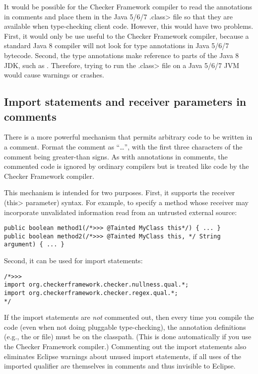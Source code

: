 It would be possible for the Checker Framework compiler to read the
annotations in comments and place them in the Java 5/6/7 \<.class> file so
that they are available when type-checking client code.  However, this
would have two problems.  First, it would only be use useful to the Checker
Framework compiler, because a standard Java 8 compiler will not look for
type annotations in Java 5/6/7 bytecode.  Second, the type annotations
make reference to parts of the Java 8 JDK, such as
.
Therefore, trying to run the \<.class> file on a Java 5/6/7 JVM
would cause warnings or crashes.


\subsection{Import statements and receiver parameters in comments\label{receivers-and-imports-in-comments}}

There is a more powerful mechanism that permits arbitrary code to be
written in a comment.  Format the comment as ``\code{/*>>>}\ldots\code{*/}'',
with the first three characters of the comment being greater-than signs. As
with annotations in comments, the commented code is ignored by ordinary
compilers but is treated like code by the
Checker Framework compiler.

This mechanism is intended for two purposes.
First, it supports the receiver (\<this> parameter) syntax.  For example,
to specify a method whose receiver may incorporate unvalidated information
read from an untrusted external source:

\begin{Verbatim}
public boolean method1(/*>>> @Tainted MyClass this*/) { ... }
public boolean method2(/*>>> @Tainted MyClass this, */ String argument) { ... }
\end{Verbatim}

Second, it can be used for import statements:

\begin{Verbatim}
/*>>>
import org.checkerframework.checker.nullness.qual.*;
import org.checkerframework.checker.regex.qual.*;
*/
\end{Verbatim}

\noindent
If the import statements are \emph{not} commented out, then every time you
compile the code (even when not doing pluggable type-checking),
the annotation definitions (e.g., the 
or  file) must be on the classpath.
(This is done automatically if you use the Checker Framework compiler.)
Commenting out the import statements also eliminates Eclipse
warnings about unused import statements, if all uses of the imported
qualifier are themselves in comments and thus invisible to Eclipse.

